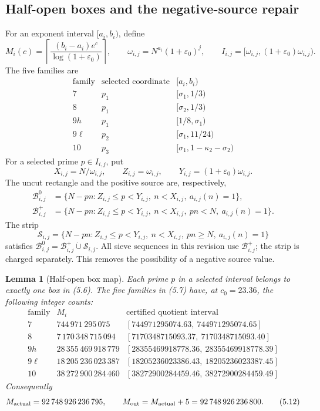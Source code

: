 \documentclass[11pt]{article}
\newtheorem{lemma}[theorem]{Lemma}
\theoremstyle{definition}
\newcommand{\eps}{\varepsilon}
\begin{document}
\subsection{Half-open boxes and the negative-source repair}
\label{sec:box-definition}

For an exponent interval \([a_i,b_i)\), define
\[
 M_i(c)=\left\lceil
 \frac{(b_i-a_i)e^c}{\log(1+\eps_0)}
 \right\rceil,\qquad
 \omega_{i,j}=N^{a_i}(1+\eps_0)^j,\qquad
 I_{i,j}=[\omega_{i,j},(1+\eps_0)\omega_{i,j}).
\tag{5.6}
\]
The five families are
\[
\begin{array}{c|c|c}
\text{family}&\text{selected coordinate}&[a_i,b_i)\\
\hline
7&p_1&[\sigma_1,1/3)\\
8&p_1&[\sigma_2,1/3)\\
9h&p_1&[1/8,\sigma_1)\\
9\ell&p_2&[\sigma_1,11/24)\\
10&p_3&[\sigma_1,1-\kappa_2-\sigma_2)
\end{array}
\tag{5.7}
\]
For a selected prime \(p\in I_{i,j}\), put
\[
 X_{i,j}=N/\omega_{i,j},\qquad
 Z_{i,j}=\omega_{i,j},\qquad
 Y_{i,j}=(1+\eps_0)\omega_{i,j}.
\tag{5.8}
\]
The uncut rectangle and the positive source are, respectively,
\[
\begin{aligned}
 \mathcal B^0_{i,j}
 &=
 \{N-pn:Z_{i,j}\le p<Y_{i,j},\ n<X_{i,j},\
 a_{i,j}(n)=1\},\\
 \mathcal B^+_{i,j}
 &=
 \{N-pn:Z_{i,j}\le p<Y_{i,j},\ n<X_{i,j},\
 pn<N,\ a_{i,j}(n)=1\}.
\end{aligned}
\tag{5.9}
\]
The strip
\[
 \mathcal S_{i,j}=\{N-pn:Z_{i,j}\le p<Y_{i,j},\
 n<X_{i,j},\ pn\ge N,\ a_{i,j}(n)=1\}
\tag{5.10}
\]
satisfies \(\mathcal B^0_{i,j}=\mathcal B^+_{i,j}\mathbin{\dot\cup}
\mathcal S_{i,j}\).  All sieve sequences in this revision use
\(\mathcal B^+_{i,j}\); the strip is charged separately.  This removes the
possibility of a negative source value.

\begin{lemma}[Half-open box map]
\label{lem:boxes}
Each prime \(p\) in a selected interval belongs to exactly one box in
(5.6).  The five families in (5.7) have, at \(c_0=23.36\), the following
integer counts:
\[
\begin{array}{c|r|r}
\text{family}&M_i&\text{certified quotient interval}\\
\hline
7&744\,971\,295\,075&
[744971295074.63,\ 744971295074.65]\\
8&7\,170\,348\,715\,094&
[7170348715093.37,\ 7170348715093.40]\\
9h&28\,355\,469\,918\,779&
[28355469918778.36,\ 28355469918778.39]\\
9\ell&18\,205\,236\,023\,387&
[18205236023386.43,\ 18205236023387.45]\\
10&38\,272\,900\,284\,460&
[38272900284459.46,\ 38272900284459.49]
\end{array}
\tag{5.11}
\]
Consequently
\[
 M_{\rm actual}=92\,748\,926\,236\,795,\qquad
 M_{\rm out}=M_{\rm actual}+5=92\,748\,926\,236\,800.
\tag{5.12}
\]
\end{lemma}
\end{document}
